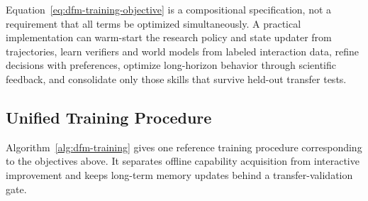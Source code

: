 \documentclass[11pt, a4paper, copyright]{google}
\begin{document}
Equation~\ref{eq:dfm-training-objective} is a compositional specification, not a requirement that all terms be optimized simultaneously. A practical implementation can warm-start the research policy and state updater from trajectories, learn verifiers and world models from labeled interaction data, refine decisions with preferences, optimize long-horizon behavior through scientific feedback, and consolidate only those skills that survive held-out transfer tests.

\subsection{Unified Training Procedure}
\label{subsec:unified-training-procedure}

Algorithm~\ref{alg:dfm-training} gives one reference training procedure corresponding to the objectives above. It separates offline capability acquisition from interactive improvement and keeps long-term memory updates behind a transfer-validation gate.
\end{document}
